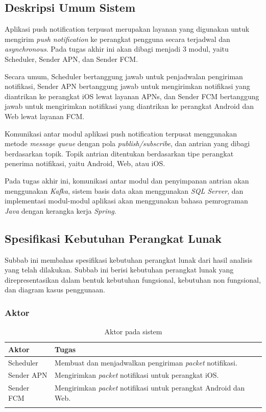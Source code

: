 \subsection{Deskripsi Umum Sistem}
\par Aplikasi push notification terpusat merupakan layanan yang digunakan untuk mengirim \textit{push notification} ke perangkat pengguna secara terjadwal dan \textit{asynchronous}. Pada tugas akhir ini akan dibagi menjadi 3 modul, yaitu Scheduler, Sender APN, dan Sender FCM.
\par Secara umum, Scheduler bertanggung jawab untuk penjadwalan pengiriman notifikasi, Sender APN bertanggung jawab untuk mengirimkan notifikasi yang diantrikan ke perangkat iOS lewat layanan APNs, dan Sender FCM bertanggung jawab untuk mengirimkan notifikasi yang diantrikan ke perangkat Android dan Web lewat layanan FCM.
\par Komunikasi antar modul aplikasi push notification terpusat menggunakan metode \textit{message queue} dengan pola \textit{publish/subscribe}, dan antrian yang dibagi berdasarkan topik. Topik antrian ditentukan berdasarkan tipe perangkat penerima notifikasi, yaitu Android, Web, atau iOS.
\par Pada tugas akhir ini, komunikasi antar modul dan penyimpanan antrian akan menggunakan \textit{Kafka}, sistem basis data akan menggunakan \textit{SQL Server}, dan implementasi modul-modul aplikasi akan menggunakan bahasa pemrograman \textit{Java} dengan kerangka kerja \textit{Spring}.

\subsection{Spesifikasi Kebutuhan Perangkat Lunak}
\par Subbab ini membahas spesifikasi kebutuhan perangkat lunak dari hasil analisis yang telah dilakukan. Subbab ini berisi kebutuhan perangkat lunak yang direpresentasikan dalam bentuk kebutuhan fungsional, kebutuhan non fungsional, dan diagram kasus penggunaan.

\subsubsection{Aktor}
\begin{longtable}{|p{2cm}|p{7cm}|}
    \hline
    \textbf{Aktor} & \textbf{Tugas} \\ \hline
    Scheduler & Membuat dan menjadwalkan pengiriman \textit{packet} notifikasi. \\ \hline
    Sender APN & Mengirimkan \textit{packet} notifikasi untuk perangkat iOS. \\ \hline
    Sender FCM & Mengirimkan \textit{packet} notifikasi untuk perangkat Android dan Web. \\ \hline
    \caption{Aktor pada sistem}
\end{longtable}

